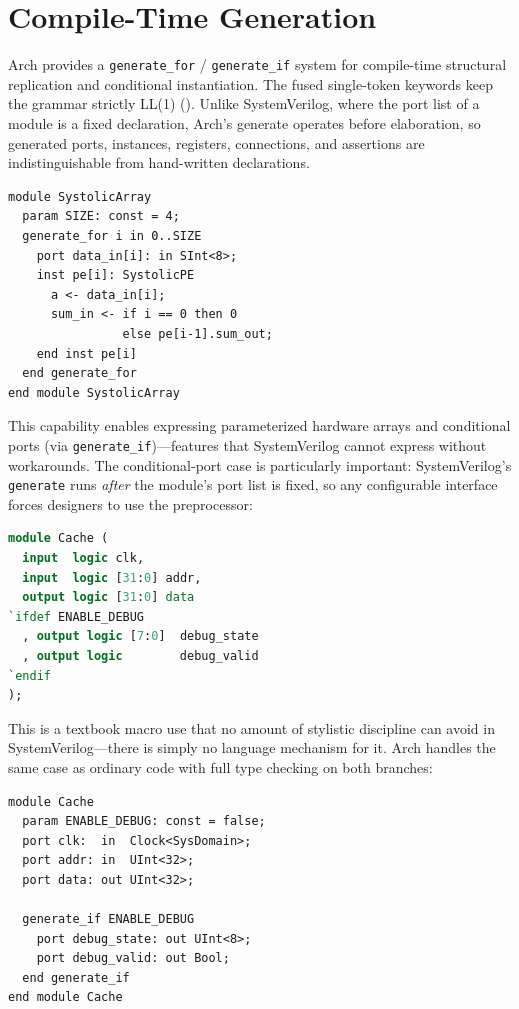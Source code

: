 \documentclass[manuscript]{acmart}
\begin{document}
\section{Compile-Time Generation}\label{sec:generate}

Arch provides a \texttt{generate\_for} / \texttt{generate\_if} system for compile-time structural replication and conditional instantiation. The fused single-token keywords keep the grammar strictly LL(1) (). Unlike SystemVerilog, where the port list of a module is a fixed declaration, Arch's generate operates before elaboration, so generated ports, instances, registers, connections, and assertions are indistinguishable from hand-written declarations.

\begin{lstlisting}[language=Arch,caption={Generate-for iteration},label={lst:gen}]
module SystolicArray
  param SIZE: const = 4;
  generate_for i in 0..SIZE
    port data_in[i]: in SInt<8>;
    inst pe[i]: SystolicPE
      a <- data_in[i];
      sum_in <- if i == 0 then 0
                else pe[i-1].sum_out;
    end inst pe[i]
  end generate_for
end module SystolicArray
\end{lstlisting}

This capability enables expressing parameterized hardware arrays and conditional ports (via \texttt{generate\_if})---features that SystemVerilog cannot express without workarounds. The conditional-port case is particularly important: SystemVerilog's \texttt{generate} runs \emph{after} the module's port list is fixed, so any configurable interface forces designers to use the preprocessor:

\begin{lstlisting}[language=SystemVerilog,caption={SystemVerilog forces preprocessor for conditional ports}]
module Cache (
  input  logic clk,
  input  logic [31:0] addr,
  output logic [31:0] data
`ifdef ENABLE_DEBUG
  , output logic [7:0]  debug_state
  , output logic        debug_valid
`endif
);
\end{lstlisting}

This is a textbook macro use that no amount of stylistic discipline can avoid in SystemVerilog---there is simply no language mechanism for it. Arch handles the same case as ordinary code with full type checking on both branches:

\begin{lstlisting}[language=Arch,caption={Conditional ports in Arch via generate\_if},label={lst:gencond}]
module Cache
  param ENABLE_DEBUG: const = false;
  port clk:  in  Clock<SysDomain>;
  port addr: in  UInt<32>;
  port data: out UInt<32>;

  generate_if ENABLE_DEBUG
    port debug_state: out UInt<8>;
    port debug_valid: out Bool;
  end generate_if
end module Cache
\end{lstlisting}
\end{document}

